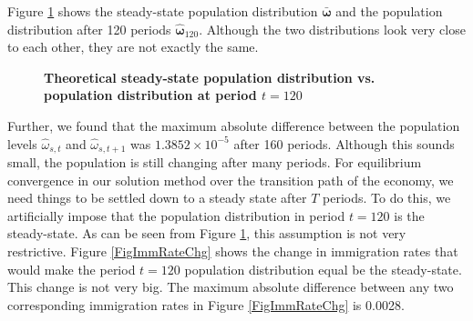 \documentclass[letterpaper,12pt]{article}
\theoremstyle{definition}
\begin{document}
    Figure \ref{FigOrigVsFixSSpop} shows the steady-state population distribution $\bm{\bar{\omega}}$ and the population distribution after 120 periods $\bm{\hat{\omega}}_{120}$. Although the two distributions look very close to each other, they are not exactly the same.

    \begin{figure}[htbp]\centering \captionsetup{width=4.0in}
      \caption{\label{FigOrigVsFixSSpop}\textbf{Theoretical steady-state population distribution vs. population distribution at period $t=120$}}
    \end{figure}

    Further, we found that the maximum absolute difference between the population levels $\hat{\omega}_{s,t}$ and $\hat{\omega}_{s,t+1}$ was $1.3852\times 10^{-5}$ after 160 periods. Although this sounds small, the population is still changing after many periods. For equilibrium convergence in our solution method over the transition path of the economy, we need things to be settled down to a steady state after $T$ periods. To do this, we artificially impose that the population distribution in period $t=120$ is the steady-state. As can be seen from Figure \ref{FigOrigVsFixSSpop}, this assumption is not very restrictive. Figure \ref{FigImmRateChg} shows the change in immigration rates that would make the period $t=120$ population distribution equal be the steady-state. This change is not very big. The maximum absolute difference between any two corresponding immigration rates in Figure \ref{FigImmRateChg} is 0.0028.
\end{document}

